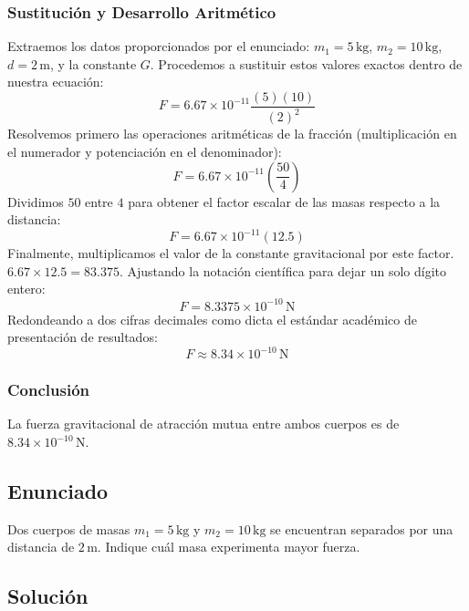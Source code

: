 \documentclass[12pt]{article}
\begin{document}
\subsubsection*{Sustitución y Desarrollo Aritmético}
Extraemos los datos proporcionados por el enunciado: $m_1 = 5 \, \text{kg}$, $m_2 = 10 \, \text{kg}$, $d = 2 \, \text{m}$, y la constante $G$. Procedemos a sustituir estos valores exactos dentro de nuestra ecuación:
\begin{equation}
    F = 6.67 \times 10^{-11} \frac{(5)(10)}{(2)^2}
\end{equation}
Resolvemos primero las operaciones aritméticas de la fracción (multiplicación en el numerador y potenciación en el denominador):
\begin{equation}
    F = 6.67 \times 10^{-11} \left( \frac{50}{4} \right)
\end{equation}
Dividimos $50$ entre $4$ para obtener el factor escalar de las masas respecto a la distancia:
\begin{equation}
    F = 6.67 \times 10^{-11} (12.5)
\end{equation}
Finalmente, multiplicamos el valor de la constante gravitacional por este factor. $6.67 \times 12.5 = 83.375$. Ajustando la notación científica para dejar un solo dígito entero:
\begin{equation}
    F = 8.3375 \times 10^{-10} \, \text{N}
\end{equation}
Redondeando a dos cifras decimales como dicta el estándar académico de presentación de resultados:
\begin{equation}
    F \approx 8.34 \times 10^{-10} \, \text{N}
\end{equation}

\subsubsection*{Conclusión}
La fuerza gravitacional de atracción mutua entre ambos cuerpos es de $8.34 \times 10^{-10} \, \text{N}$.

\newpage

\subsection*{Enunciado}
Dos cuerpos de masas $m_1 = 5 \, \text{kg}$ y $m_2 = 10 \, \text{kg}$ se encuentran separados por una distancia de $2 \, \text{m}$. Indique cuál masa experimenta mayor fuerza.

\subsection*{Solución}
\end{document}
